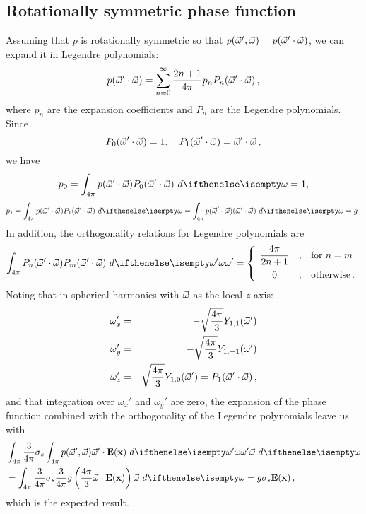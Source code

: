 \documentclass[10pt,a4paper]{article}
\begin{document}
\subsection{Rotationally symmetric phase function}
\label{sec:furtherderiv}
Assuming that $p$ is rotationally symmetric so that $p(\vec{\omega}', \vec{\omega}) = p(\vec{\omega}' \cdot \vec{\omega})$, we can expand it in Legendre polynomials:
$$
p(\vec{\omega}' \cdot \vec{\omega}) = \sum_{n = 0}^{\infty} \frac{2n+1}{4\pi} p_{n} P_n(\vec{\omega}' \cdot \vec{\omega}) \,,
$$
where $p_n$ are the expansion coefficients and $P_n$ are the Legendre polynomials. Since
$$
P_0(\vec{\omega}' \cdot \vec{\omega}) = 1, \quad P_1(\vec{\omega}' \cdot \vec{\omega}) = \vec{\omega}' \cdot \vec{\omega}  \, ,
$$
we have
$$
p_0 = \sphere{p(\omegavec' \cdot \omegavec) P_0(\omegavec' \cdot \omegavec)}{} = 1,
$$
$$
p_1 = \sphere{p(\omegavec' \cdot \omegavec) P_1(\omegavec' \cdot \omegavec)}{} = \sphere{p(\omegavec' \cdot \omegavec) (\omegavec' \cdot \omegavec)}{} = g \, .
$$
In addition, the orthogonality relations for Legendre polynomials are
$$
\sphere{P_n(\omegavec' \cdot \omegavec)P_m(\omegavec' \cdot \omegavec)}{\omega'} = \left\{\begin{array}{c@{\quad,\quad}l}\displaystyle\frac{4\pi}{2n+1} & \text{for $n=m$} \\[2ex] 0 & \text{otherwise} \, . \end{array} \right.
$$
Noting that in spherical harmonics with $\vec{\omega}$ as the local $z$-axis:
\begin{eqnarray*}
\omega_x' & = & -\sqrt{\frac{4\pi}{3}}Y_{1,1}(\vec{\omega}') \\
\omega_y' & = & -\sqrt{\frac{4\pi}{3}}Y_{1,-1}(\vec{\omega}') \\
\omega_z' & = & \sqrt{\frac{4\pi}{3}}Y_{1,0}(\vec{\omega}') = P_1(\vec{\omega}' \cdot \vec{\omega}) \, ,
\end{eqnarray*}
and that integration over $\omega_x'$ and $\omega_y'$ are zero, the expansion of the phase function combined with the orthogonality of the Legendre polynomials leave us with
\begin{equation*}
\begin{split}
&\sphere{ \frac{3}{4\pi} \scattering  \sphere {p(\omegavec', \omegavec)  \omegavec' \cdot \xvecfunc{E}}{\omega'} \omegavec}{} \\
&= \sphere{ \frac{3}{4\pi} \scattering \frac{3}{4\pi}g \left(\frac{4\pi}{3}\omegavec\cdot\xvecfunc{E}\right) \omegavec}{} = g \scattering  \xvecfunc{E} \, ,
\end{split}
\end{equation*}
which is the expected result.
\end{document}
